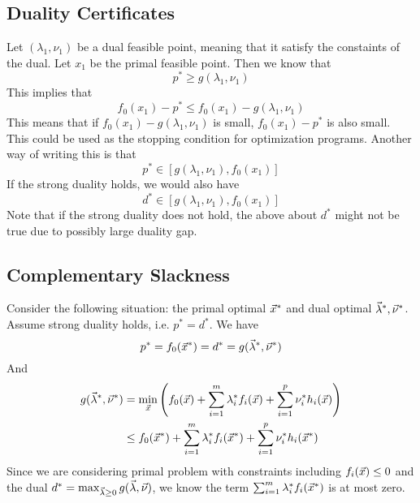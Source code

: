 
\subsection{Duality Certificates} %
\label{sub:duality_certificates}

\begin{definition}[certificate]
	Let $(\lambda_1, \nu_1)$ be a dual feasible point, meaning that it satisfy the constaints of the dual. Let $x_1$ be the primal feasible point. Then we know that
	\[
p^* \ge g(\lambda_1, \nu_1)
	\]
	This implies that
	\[
f_0(x_1)-p^* \le f_0(x_1)-g(\lambda_1, \nu_1)
	\]
	This means that if $f_0(x_1)-g(\lambda_1, \nu_1)$ is small, $f_0(x_1)-p^*$ is also small. This could be used as the stopping condition for optimization programs. Another way of writing this is that
	\[
p^* \in [g(\lambda_1, \nu_1), f_0(x_1)]
	\]
	If the strong duality holds, we would also have
	\[
d^* \in [g(\lambda_1, \nu_1), f_0(x_1)]
	\]
	Note that if the strong duality does not hold, the above about $d^*$ might not be true due to possibly large duality gap.
\end{definition}


\subsection{Complementary Slackness} %
\label{sub:complementary_slackness}

\begin{definition}
	Consider the following situation: the primal optimal $\vec{x}^*$ and dual optimal $\vec{\lambda}^*, \vec{\nu}^*$. Assume strong duality holds, i.e. $p^*=d^*$. We have
	\[
p^* = f_0(\vec{x}^*) = d^* = g(\vec{\lambda}^*, \vec{\nu}^*)  
	\]
	And
	\begin{align*}
		g(\vec{\lambda}^*, \vec{\nu}^*) &= \min_{\vec{x}} \left(f_0(\vec{x})+\sum_{i=1}^m \lambda_i^*f_i(\vec{x})+\sum_{i=1}^p\nu_i^*h_i(\vec{x})\right)\\
		&\le f_0(\vec{x}^*) + \sum_{i=1}^m \lambda_i^*f_i(\vec{x}^*)+\sum_{i=1}^p\nu_i^*h_i(\vec{x}^*)
	\end{align*}
	Since we are considering primal problem with constraints including $f_i(\vec{x})\le 0$ and the dual $d^* = \max_{\vec{\lambda}\ge 0}g(\vec{\lambda},\vec{\nu})$, we know the term $\sum_{i=1}^m \lambda_i^*f_i(\vec{x}^*)$ is at most zero.
\end{definition}


